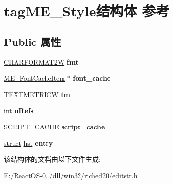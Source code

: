 \hypertarget{structtag_m_e___style}{}\section{tag\+M\+E\+\_\+\+Style结构体 参考}
\label{structtag_m_e___style}
\subsection*{Public 属性}
\begin{DoxyCompactItemize}
\item 
\mbox{\label{structtag_m_e___style_a5327926fe48ee6f01633872281962e1a}} 
\hyperlink{struct__charformat2w}{C\+H\+A\+R\+F\+O\+R\+M\+A\+T2W} {\bfseries fmt}
\item 
\mbox{\label{structtag_m_e___style_aa2824f1f3cda4589269693733fa975f6}} 
\hyperlink{structtag_m_e___font_cache_item}{M\+E\+\_\+\+Font\+Cache\+Item} $\ast$ {\bfseries font\+\_\+cache}
\item 
\mbox{\label{structtag_m_e___style_afcbbca21216f6fbeafe8f2f770d29520}} 
\hyperlink{structtag_t_e_x_t_m_e_t_r_i_c_w}{T\+E\+X\+T\+M\+E\+T\+R\+I\+CW} {\bfseries tm}
\item 
\mbox{\label{structtag_m_e___style_aea06750b9f12b0ca4f227f29319c6b95}} 
int {\bfseries n\+Refs}
\item 
\mbox{\label{structtag_m_e___style_a873e3558ed36efbea1b28b1768054df4}} 
\hyperlink{interfacevoid}{S\+C\+R\+I\+P\+T\+\_\+\+C\+A\+C\+HE} {\bfseries script\+\_\+cache}
\item 
\mbox{\label{structtag_m_e___style_a5390bc40bcad46e2acf65ef7d431d238}} 
\hyperlink{interfacestruct}{struct} \hyperlink{classlist}{list} {\bfseries entry}
\end{DoxyCompactItemize}


该结构体的文档由以下文件生成\+:\begin{DoxyCompactItemize}
\item 
E\+:/\+React\+O\+S-\/0../dll/win32/riched20/editstr.\+h\end{DoxyCompactItemize}
